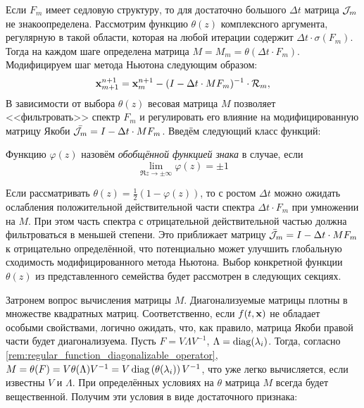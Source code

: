Если $ F_m $ имеет седловую структуру, то для достаточно большого $ \Delta t $ матрица $ \mathcal{J}_m $ не знакоопределена.
Рассмотрим функцию $ \theta(z) $ комплексного аргумента, регулярную в такой области, которая на любой итерации содержит $ \Delta t \cdot \sigma(F_m) $.
Тогда на каждом шаге определена матрица $ M = M_m = \theta(\Delta t \cdot F_m) $.
Модифицируем шаг метода Ньютона следующим образом:
%
\begin{equation}
    \label{eq:modified_Newton_iteration}
    \mathbf{x}_{m+1}^{n+1} = \mathbf{x}_m^{n+1} - (I - \Delta t \cdot M F_m)^{-1} \cdot \mathcal{R}_m,
\end{equation}
%
В зависимости от выбора $ \theta(z) $ весовая матрица $ M $ позволяет <<фильтровать>> спектр $ F_m $
и регулировать его влияние на модифицированную матрицу Якоби $ \bar{\mathcal{J}_m} = I - \Delta t \cdot M F_m $.
Введём следующий класс функций:

\begin{definition}
    \label{def:generalized_sign_function}
    Функцию $ \varphi(z) $ назовём \emph{обобщённой функцией знака} в случае, если
    \[
        \lim_{\Re z \to \pm \infty} \varphi(z) = \pm 1
    \]
\end{definition}

Если рассматривать $ \theta(z) = \frac{1}{2} (1 - \varphi(z)) $,
то с ростом $ \Delta t $ можно ожидать ослабления положительной действительной части спектра $ \Delta t \cdot F_m $ при умножении на $ M $.
При этом часть спектра с отрицательной действительной частью должна фильтроваться в меньшей степени.
Это приближает матрицу $ \bar{\mathcal{J}}_m = I - \Delta t \cdot M F_m $ к отрицательно определённой,
что потенциально может улучшить глобальную сходимость модифицированного метода Ньютона.
Выбор конкретной функции $ \theta(z) $ из представленного семейства будет рассмотрен в следующих секциях.

Затронем вопрос вычисления матрицы $ M $.
Диагонализуемые матрицы плотны в множестве квадратных матриц.
Соответственно, если $ f(t, \mathbf{x}) $ не обладает особыми свойствами, логично ожидать, что, как правило,
матрица Якоби правой части будет диагонализуема.
Пусть $ F = V \Lambda V^{-1} $, $ \Lambda = \operatorname{diag}(\lambda_i) $.
Тогда, согласно \ref{rem:regular_function_diagonalizable_operator}, $ M = \theta(F) = V \theta(\Lambda) V^{-1} = V \operatorname{diag}\left( \theta(\lambda_i) \right) V^{-1} $,
что уже легко вычисляется, если известны $ V $ и $ \Lambda $.
При определённых условиях на $ \theta $ матрица $ M $ всегда будет вещественной.
Получим эти условия в виде достаточного признака:

